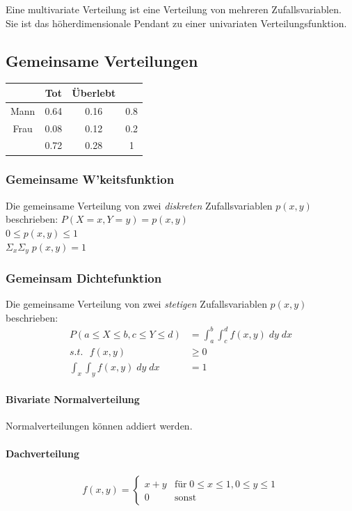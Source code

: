 \documentclass[a3paper, 8pt]{extarticle}
\begin{document}
\begin{multicols*}{5}
   
Eine multivariate Verteilung ist eine Verteilung von mehreren Zufallsvariablen. Sie ist das höherdimensionale Pendant zu einer univariaten Verteilungsfunktion.

\subsection{Gemeinsame Verteilungen}

\begin{center}
    \begin{tabular}{c|c|c|c}
         & Tot & Überlebt &   \\\hline 
        Mann & 0.64 & 0.16 & 0.8\\ \hline 
        Frau & 0.08 & 0.12 & 0.2 \\ \hline 
        & 0.72 & 0.28 & 1
    \end{tabular}
\end{center}
    

    \subsubsection{Gemeinsame W'keitsfunktion}{} Die gemeinsame Verteilung von zwei \textit{diskreten} Zufallsvariablen  $p(x,y)$ beschrieben:
    $P(X=x, Y=y) = p(x,y)$ \\
     $0 \leq p(x,y) \leq 1$ \\
    $\Sigma_x \Sigma_y \; p(x,y) = 1$
    
 
    \subsubsection{Gemeinsam Dichtefunktion} Die gemeinsame Verteilung von zwei \textit{stetigen} Zufallsvariablen $p(x,y)$ beschrieben:
    \begin{align*}
        P(a \leq X \leq b, c \leq Y \leq d) &= \int_a^b \int_c^d f(x,y)\; dy \; dx \\
        s.t. \:\:\: f(x,y) &\geq 0 \\
        \int_x \int_y f(x,y) \; dy \; dx &= 1
    \end{align*}
    
\paragraph{Bivariate Normalverteilung}
    Normalverteilungen können addiert werden.
    
\paragraph{Dachverteilung}
\begin{align*}
f(x,y)=
\begin{cases}
x+y & \text{für} \;0 \leq x\leq 1, 0 \leq y\leq 1\\
0 & \text{sonst}
\end{cases}
\end{align*}
    

\end{multicols*}
\end{document}
